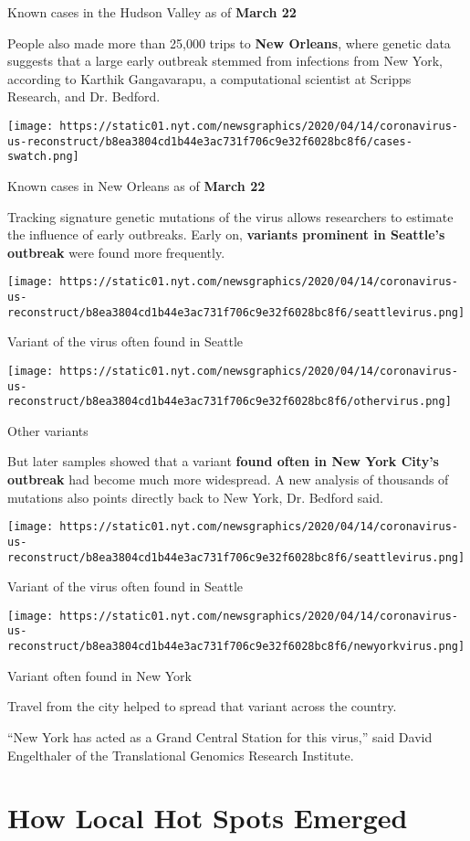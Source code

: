 Known cases in the Hudson Valley as of \textbf{March 22}

People also made more than 25,000 trips to \textbf{New Orleans}, where
genetic data suggests that a large early outbreak stemmed from
infections from New York, according to Karthik Gangavarapu, a
computational scientist at Scripps Research, and Dr. Bedford.

\texttt{[image: https://static01.nyt.com/newsgraphics/2020/04/14/coronavirus-us-reconstruct/b8ea3804cd1b44e3ac731f706c9e32f6028bc8f6/cases-swatch.png]}

Known cases in New Orleans as of \textbf{March 22}

Tracking signature genetic mutations of the virus allows researchers to
estimate the influence of early outbreaks. Early on, \textbf{variants
prominent in Seattle's outbreak} were found more frequently.

\texttt{[image: https://static01.nyt.com/newsgraphics/2020/04/14/coronavirus-us-reconstruct/b8ea3804cd1b44e3ac731f706c9e32f6028bc8f6/seattlevirus.png]}

Variant of the virus often found in Seattle

\texttt{[image: https://static01.nyt.com/newsgraphics/2020/04/14/coronavirus-us-reconstruct/b8ea3804cd1b44e3ac731f706c9e32f6028bc8f6/othervirus.png]}

Other variants

But later samples showed that a variant \textbf{found often in New York
City's outbreak} had become much more widespread. A new analysis of
thousands of mutations also points directly back to New York, Dr.
Bedford said.

\texttt{[image: https://static01.nyt.com/newsgraphics/2020/04/14/coronavirus-us-reconstruct/b8ea3804cd1b44e3ac731f706c9e32f6028bc8f6/seattlevirus.png]}

Variant of the virus often found in Seattle

\texttt{[image: https://static01.nyt.com/newsgraphics/2020/04/14/coronavirus-us-reconstruct/b8ea3804cd1b44e3ac731f706c9e32f6028bc8f6/newyorkvirus.png]}

Variant often found in New York

Travel from the city helped to spread that variant across the country.

``New York has acted as a Grand Central Station for this virus,'' said
David Engelthaler of the Translational Genomics Research Institute.

\hypertarget{how-local-hot-spots-emerged}{%
\section{How Local Hot Spots
Emerged}\label{how-local-hot-spots-emerged}}

